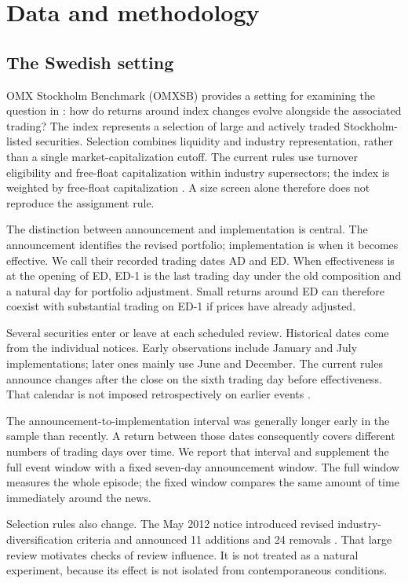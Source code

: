 \section{Data and methodology}\label{sec:data}
\subsection{The Swedish setting}

OMX Stockholm Benchmark (OMXSB) provides a setting for examining the question in \citet{greenwood2025}: how do returns around index changes evolve alongside the associated trading? The index represents a selection of large and actively traded Stockholm-listed securities. Selection combines liquidity and industry representation, rather than a single market-capitalization cutoff. The current rules use turnover eligibility and free-float capitalization within industry supersectors; the index is weighted by free-float capitalization \citep{nasdaq2026}. A size screen alone therefore does not reproduce the assignment rule.

The distinction between announcement and implementation is central. The announcement identifies the revised portfolio; implementation is when it becomes effective. We call their recorded trading dates AD and ED. When effectiveness is at the opening of ED, ED-1 is the last trading day under the old composition and a natural day for portfolio adjustment. Small returns around ED can therefore coexist with substantial trading on ED-1 if prices have already adjusted.

Several securities enter or leave at each scheduled review. Historical dates come from the individual notices. Early observations include January and July implementations; later ones mainly use June and December. The current rules announce changes after the close on the sixth trading day before effectiveness. That calendar is not imposed retrospectively on earlier events \citep{nasdaq2013,nasdaq2026}.

The announcement-to-implementation interval was generally longer early in the sample than recently. A return between those dates consequently covers different numbers of trading days over time. We report that interval and supplement the full event window with a fixed seven-day announcement window. The full window measures the whole episode; the fixed window compares the same amount of time immediately around the news.

Selection rules also change. The May 2012 notice introduced revised industry-diversification criteria and announced 11 additions and 24 removals \citep{nasdaq2012review}. That large review motivates checks of review influence. It is not treated as a natural experiment, because its effect is not isolated from contemporaneous conditions.

